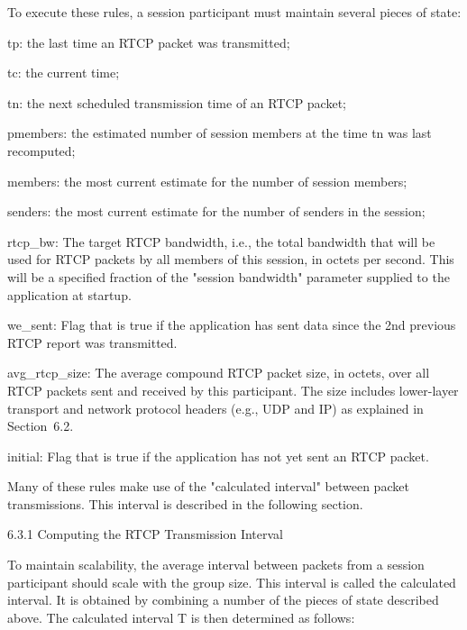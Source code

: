 \documentclass{article}
\begin{document}
To execute these rules, a session participant must maintain several pieces of state:

tp: the last time an RTCP packet was transmitted;

tc: the current time;

tn: the next scheduled transmission time of an RTCP packet;

pmembers: the estimated number of session members at the time tn was last recomputed;

members: the most current estimate for the number of session members;

senders: the most current estimate for the number of senders in the session;

rtcp\_bw: The target RTCP bandwidth, i.e., the total bandwidth that will be used for RTCP packets by all members of this session, in octets per second.  This will be a specified fraction of the "session bandwidth" parameter supplied to the application at startup.

we\_sent: Flag that is true if the application has sent data since the 2nd previous RTCP report was transmitted.

avg\_rtcp\_size: The average compound RTCP packet size, in octets, over all RTCP packets sent and received by this participant.  The size includes lower-layer transport and network protocol headers (e.g., UDP and IP) as explained in Section~6.2.

initial: Flag that is true if the application has not yet sent an RTCP packet.

Many of these rules make use of the "calculated interval" between packet transmissions.  This interval is described in the following section.

6.3.1 Computing the RTCP Transmission Interval

To maintain scalability, the average interval between packets from a session participant should scale with the group size.  This interval is called the calculated interval.  It is obtained by combining a number of the pieces of state described above.  The calculated interval T is then determined as follows:
\end{document}

